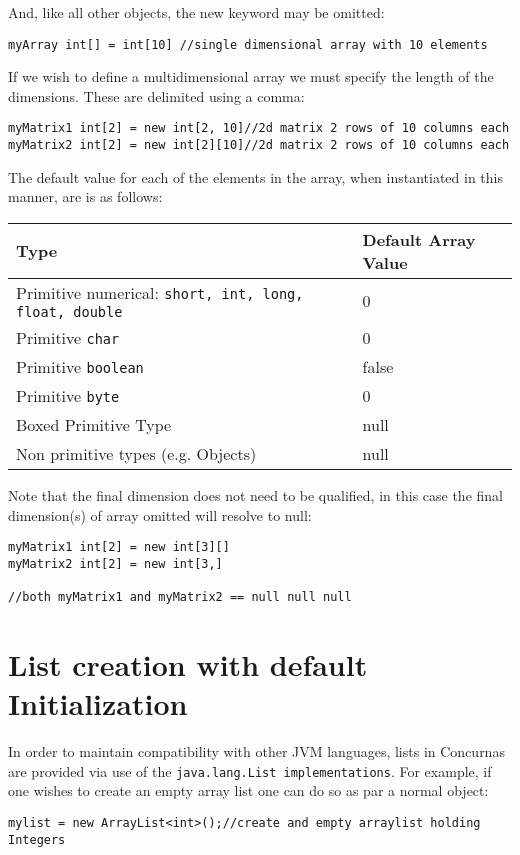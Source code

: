 \documentclass[conc-doc]{subfiles}
\begin{document}
And, like all other objects, the new keyword may be omitted:
\begin{lstlisting}
myArray int[] = int[10] //single dimensional array with 10 elements
\end{lstlisting}

If we wish to define a multidimensional array we must specify the length of the dimensions. These are delimited using a comma:
\begin{lstlisting}
myMatrix1 int[2] = new int[2, 10]//2d matrix 2 rows of 10 columns each
myMatrix2 int[2] = new int[2][10]//2d matrix 2 rows of 10 columns each
\end{lstlisting}

The default value for each of the elements in the array, when instantiated in this manner, are is as follows:

\begin{table}[H]
	\centering
	\begin{tabular}{ll}
		\hline
		Type&Default Array Value\\
		\hline
		Primitive numerical: \lstinline!short, int, long, float, double!&0\\
		Primitive \lstinline!char!&0\\
		Primitive \lstinline!boolean!&false\\
		Primitive \lstinline!byte!&0\\
		Boxed Primitive Type&null\\
		Non primitive types (e.g. Objects)&null\\
		\hline
	\end{tabular}%
\end{table}

Note that the final dimension does not need to be qualified, in this case the final dimension(s) of array omitted will resolve to null:
\begin{lstlisting}
myMatrix1 int[2] = new int[3][]
myMatrix2 int[2] = new int[3,]

//both myMatrix1 and myMatrix2 == null null null
\end{lstlisting}

\section{List creation with default Initialization}
In order to maintain compatibility with other JVM languages, lists in Concurnas are provided via use of the \lstinline{java.lang.List implementations}. For example, if one wishes to create an empty array list one can do so as par a normal object:
\begin{lstlisting}
mylist = new ArrayList<int>();//create and empty arraylist holding Integers
\end{lstlisting}
\end{document}
